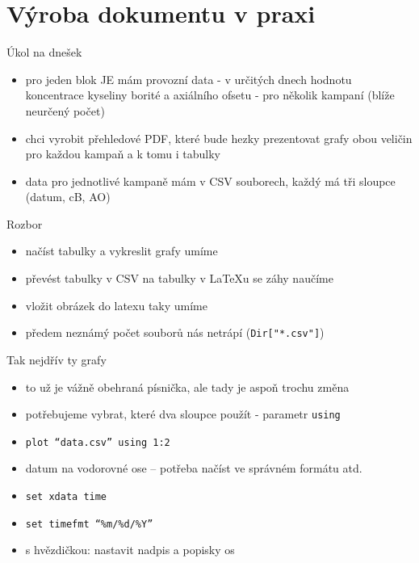 \documentclass{beamer}
\begin{document}
\section{Výroba dokumentu v praxi}

\begin{frame}{Úkol na dnešek}
  \begin{itemize}
    \item pro jeden blok JE mám provozní data - v určitých dnech hodnotu koncentrace kyseliny borité a axiálního ofsetu - pro několik kampaní (blíže neurčený počet)
    \item chci vyrobit přehledové PDF, které bude hezky prezentovat grafy obou veličin pro každou kampaň a k tomu i tabulky
    \item data pro jednotlivé kampaně mám v CSV souborech, každý má tři sloupce (datum, cB, AO)
  \end{itemize}
\end{frame}

\begin{frame}{Rozbor}
  \begin{itemize}
    \item načíst tabulky a vykreslit grafy umíme
    \item převést tabulky v CSV na tabulky v LaTeXu se záhy naučíme
    \item vložit obrázek do latexu taky umíme
    \item předem neznámý počet souborů nás netrápí (\texttt{Dir["*.csv"]})
  \end{itemize}
\end{frame}

\begin{frame}{Tak nejdřív ty grafy}
  \begin{itemize}
    \item to už je vážně obehraná písnička, ale tady je aspoň trochu změna
    \item potřebujeme vybrat, které dva sloupce použít - parametr \texttt{using}
    \item \texttt{plot ``data.csv'' using 1:2}
    \item datum na vodorovné ose -- potřeba načíst ve správném formátu atd.
    \item \texttt{set xdata time}
    \item \texttt{set timefmt ``\%m/\%d/\%Y''}
    \item s hvězdičkou: nastavit nadpis a popisky os
  \end{itemize}
\end{frame}
\end{document}

